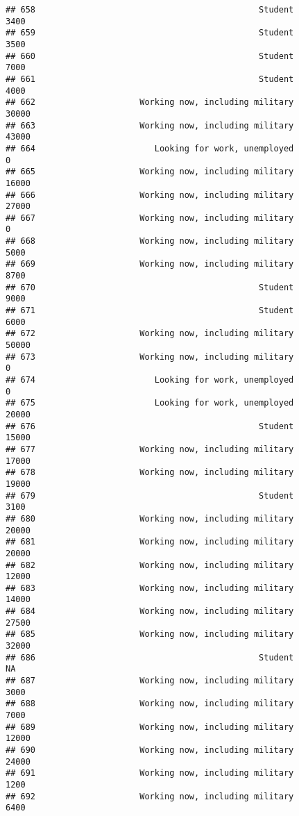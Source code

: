 \documentclass[]{book}
\theoremstyle{definition}
\theoremstyle{definition}
\theoremstyle{remark}
\begin{document}
\begin{verbatim}
## 658                                             Student            3400
## 659                                             Student            3500
## 660                                             Student            7000
## 661                                             Student            4000
## 662                     Working now, including military           30000
## 663                     Working now, including military           43000
## 664                        Looking for work, unemployed               0
## 665                     Working now, including military           16000
## 666                     Working now, including military           27000
## 667                     Working now, including military               0
## 668                     Working now, including military            5000
## 669                     Working now, including military            8700
## 670                                             Student            9000
## 671                                             Student            6000
## 672                     Working now, including military           50000
## 673                     Working now, including military               0
## 674                        Looking for work, unemployed               0
## 675                        Looking for work, unemployed           20000
## 676                                             Student           15000
## 677                     Working now, including military           17000
## 678                     Working now, including military           19000
## 679                                             Student            3100
## 680                     Working now, including military           20000
## 681                     Working now, including military           20000
## 682                     Working now, including military           12000
## 683                     Working now, including military           14000
## 684                     Working now, including military           27500
## 685                     Working now, including military           32000
## 686                                             Student              NA
## 687                     Working now, including military            3000
## 688                     Working now, including military            7000
## 689                     Working now, including military           12000
## 690                     Working now, including military           24000
## 691                     Working now, including military            1200
## 692                     Working now, including military            6400

\end{verbatim}
\end{document}
